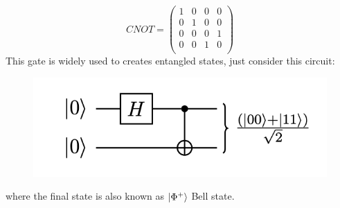 \begin{equation*}
    CNOT =  \left(\begin{array}{cccc}
1 & 0 & 0 & 0\\
0 & 1 & 0 & 0\\
0 & 0 & 0 & 1\\
0 & 0 & 1 & 0\\
\end{array}\right)  
\end{equation*}
This gate is widely used to creates
entangled states, just consider this circuit: 
\begin{figure}[h!]
    \centering
    \includegraphics[scale=0.5]{Mainmatter/images/CNOT_entangled.png}
\end{figure}


where the final state is also known as $\ket{\Phi^+}$ Bell state.